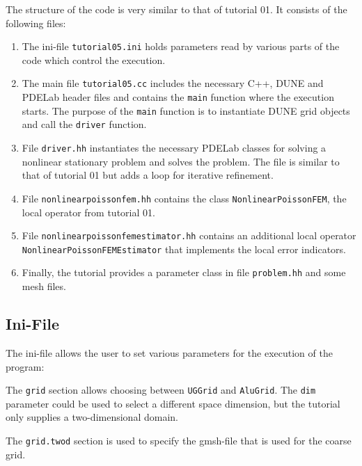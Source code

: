 \documentclass[a4paper,12pt]{article}
\begin{document}
The structure of the code is very similar to that of tutorial 01. It consists of the following
files:
\begin{enumerate}[1)]
\item The ini-file
\lstinline{tutorial05.ini} holds parameters read by various parts of the code
which control the execution.
\item The main file \lstinline{tutorial05.cc} includes the necessary C++,
DUNE and PDELab header files
and contains the \lstinline{main} function where the execution starts.
The purpose of the \lstinline{main} function is
to instantiate DUNE grid objects and call the \lstinline{driver} function.
\item File \lstinline{driver.hh} instantiates the necessary PDELab classes
for solving a nonlinear stationary problem and solves the problem. The file is similar
to that of tutorial 01 but adds a loop for iterative refinement.
\item File \lstinline{nonlinearpoissonfem.hh} contains the class
\lstinline{NonlinearPoissonFEM}, the local operator from tutorial 01.
\item File \lstinline{nonlinearpoissonfemestimator.hh} contains an additional local operator
  \lstinline{NonlinearPoissonFEMEstimator} that implements the local error indicators.
\item Finally, the tutorial provides a parameter class in file \lstinline{problem.hh}
and some mesh files.
\end{enumerate}

\subsection{Ini-File}

The ini-file allows the user to set various parameters for the
execution of the program:


The \lstinline{grid} section allows choosing between \lstinline{UGGrid} and \lstinline{AluGrid}.
The \lstinline{dim} parameter could be used to select a different space dimension, but the
tutorial only supplies a two-dimensional domain.


The \lstinline{grid.twod} section is used to specify the gmsh-file that is used for the
coarse grid.
\end{document}
